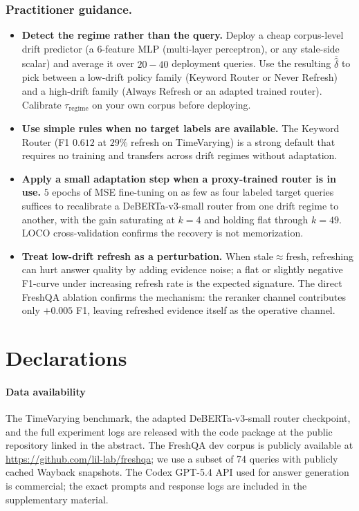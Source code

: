 \documentclass[pdflatex,sn-basic]{sn-jnl}
\begin{document}
\subsubsection*{Practitioner guidance.}
\begin{itemize}
  \item \textbf{Detect the regime rather than the query.} Deploy a cheap corpus-level drift predictor (a 6-feature MLP (multi-layer perceptron), or any stale-side scalar) and average it over $20{-}40$ deployment queries. Use the resulting $\overline{\hat\delta}$ to pick between a low-drift policy family (Keyword Router or Never Refresh) and a high-drift family (Always Refresh or an adapted trained router). Calibrate $\tau_{\text{regime}}$ on your own corpus before deploying.
  \item \textbf{Use simple rules when no target labels are available.} The Keyword Router (F1 $0.612$ at $29\%$ refresh on TimeVarying) is a strong default that requires no training and transfers across drift regimes without adaptation.
  \item \textbf{Apply a small adaptation step when a proxy-trained router is in use.} $5$ epochs of MSE fine-tuning on as few as four labeled target queries suffices to recalibrate a DeBERTa-v3-small router from one drift regime to another, with the gain saturating at $k{=}4$ and holding flat through $k{=}49$. LOCO cross-validation confirms the recovery is not memorization.
  \item \textbf{Treat low-drift refresh as a perturbation.} When stale$\approx$fresh, refreshing can hurt answer quality by adding evidence noise; a flat or slightly negative F1-curve under increasing refresh rate is the expected signature. The direct FreshQA ablation confirms the mechanism: the reranker channel contributes only $+0.005$ F1, leaving refreshed evidence itself as the operative channel.
\end{itemize}

\section*{Declarations}

\paragraph*{Data availability}
The TimeVarying benchmark, the adapted DeBERTa-v3-small router checkpoint, and the full experiment logs are released with the code package at the public repository linked in the abstract. The FreshQA dev corpus is publicly available at \url{https://github.com/lil-lab/freshqa}; we use a subset of 74 queries with publicly cached Wayback snapshots. The Codex GPT-5.4 API used for answer generation is commercial; the exact prompts and response logs are included in the supplementary material.
\end{document}
